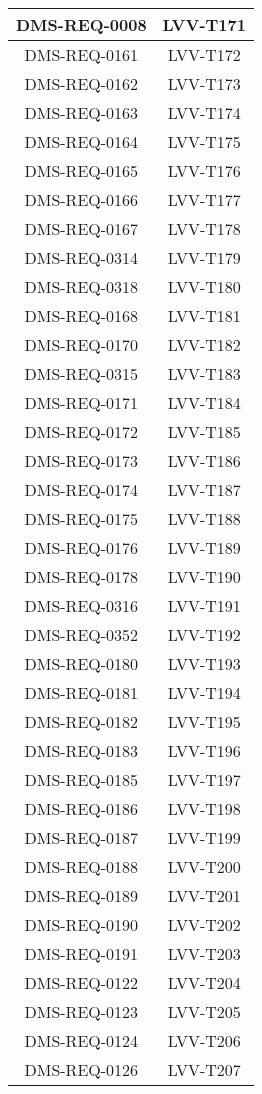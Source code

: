 \begin{longtable}{|c|c|}
DMS-REQ-0008 & LVV-T171\\\hline
DMS-REQ-0161 & LVV-T172\\\hline
DMS-REQ-0162 & LVV-T173\\\hline
DMS-REQ-0163 & LVV-T174\\\hline
DMS-REQ-0164 & LVV-T175\\\hline
DMS-REQ-0165 & LVV-T176\\\hline
DMS-REQ-0166 & LVV-T177\\\hline
DMS-REQ-0167 & LVV-T178\\\hline
DMS-REQ-0314 & LVV-T179\\\hline
DMS-REQ-0318 & LVV-T180\\\hline
DMS-REQ-0168 & LVV-T181\\\hline
DMS-REQ-0170 & LVV-T182\\\hline
DMS-REQ-0315 & LVV-T183\\\hline
DMS-REQ-0171 & LVV-T184\\\hline
DMS-REQ-0172 & LVV-T185\\\hline
DMS-REQ-0173 & LVV-T186\\\hline
DMS-REQ-0174 & LVV-T187\\\hline
DMS-REQ-0175 & LVV-T188\\\hline
DMS-REQ-0176 & LVV-T189\\\hline
DMS-REQ-0178 & LVV-T190\\\hline
DMS-REQ-0316 & LVV-T191\\\hline
DMS-REQ-0352 & LVV-T192\\\hline
DMS-REQ-0180 & LVV-T193\\\hline
DMS-REQ-0181 & LVV-T194\\\hline
DMS-REQ-0182 & LVV-T195\\\hline
DMS-REQ-0183 & LVV-T196\\\hline
DMS-REQ-0185 & LVV-T197\\\hline
DMS-REQ-0186 & LVV-T198\\\hline
DMS-REQ-0187 & LVV-T199\\\hline
DMS-REQ-0188 & LVV-T200\\\hline
DMS-REQ-0189 & LVV-T201\\\hline
DMS-REQ-0190 & LVV-T202\\\hline
DMS-REQ-0191 & LVV-T203\\\hline
DMS-REQ-0122 & LVV-T204\\\hline
DMS-REQ-0123 & LVV-T205\\\hline
DMS-REQ-0124 & LVV-T206\\\hline
DMS-REQ-0126 & LVV-T207\\\hline

\end{longtable}
